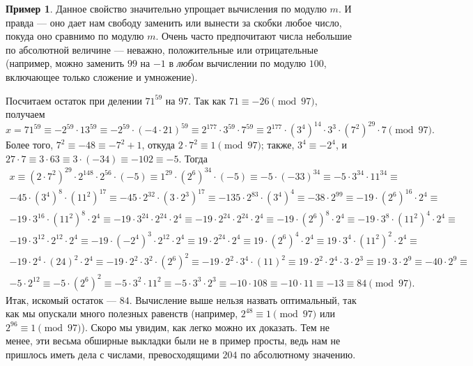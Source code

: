 \documentclass[12pt,notitlepage]{article}
\theoremstyle{plain}
\theoremstyle{definition}
\newtheorem{exm}[thm]{Пример}
\theoremstyle{plain}
\newcommand{\1}{\mathbf{1}}
\newcommand{\0}{\mathbf{0}}
\begin{document}
\begin{exm}
	Данное свойство значительно упрощает вычисления по модулю $m$. И правда --- оно дает нам свободу заменить или вынести за скобки любое число, покуда оно сравнимо по модулю $m$. Очень часто предпочитают числа небольшие по абсолютной величине --- неважно, положительные или отрицательные (например, можно заменить $99$ на $-1$ в \emph{любом} вычислении по модулю $100$, включающее только сложение и умножение).
	
	Посчитаем остаток при делении $71^{59}$ на $97$. Так как $71 \equiv -26 \pmod{97}$, получаем
	$$x = 71^{59} \equiv -2^{59}\cdot 13^{59} \equiv -2^{59}\cdot (-4\cdot 21)^{59} \equiv 2^{177} \cdot 3^{59} \cdot 7^{59} \equiv 2^{177} \cdot (3^4)^{14} \cdot 3^3 \cdot (7^2)^{29} \cdot 7  \pmod {97}.$$
	Более того, $7^2 \equiv -48 \equiv -7^2 + 1$, откуда $2\cdot7^2 \equiv 1 \pmod{97}$; также, $3^4 \equiv -2^4$, и $27\cdot 7 \equiv 3 \cdot 63 \equiv 3 \cdot (-34) \equiv -102 \equiv -5$. Тогда
	\begin{multline*}
		x \equiv (2\cdot 7^2)^{29} \cdot 2^{148} \cdot 2^{56} \cdot (-5) \equiv 1^{29} \cdot (2^6)^{34} \cdot (-5) \equiv -5 \cdot (-33) ^{34} \equiv -5 \cdot 3^{34} \cdot 11^{34}  \equiv \\
		-45 \cdot (3^4)^{8} \cdot (11^2)^{17} \equiv -45 \cdot 2^{32} \cdot (3 \cdot 2^3)^{17} \equiv -135 \cdot 2^{83} \cdot (3^4)^4  \equiv -38 \cdot 2^{99} \equiv -19 \cdot (2^6)^{16} \cdot 2^4 \equiv \\
		-19 \cdot 3^{16} \cdot (11^2)^8 \cdot 2^4 \equiv -19 \cdot 3^{24} \cdot 2^{24} \cdot 2^4 \equiv -19 \cdot 2^{24} \cdot 2^{24} \cdot 2^4  \equiv -19 \cdot (2^6)^8 \cdot 2^4 \equiv -19 \cdot 3^{8} \cdot (11^2)^4 \cdot 2^4 \equiv\\
		-19 \cdot 3^{12} \cdot 2^{12} \cdot 2^{4} \equiv -19 \cdot (-2^{4})^3 \cdot 2^{12} \cdot 2^4 \equiv 19 \cdot 2^{24} \cdot 2^4 \equiv 19 \cdot (2^6)^4 \cdot 2^4 \equiv 19 \cdot 3^{4} \cdot (11^2)^2 \cdot 2^4 \equiv\\
		-19 \cdot 2^{4} \cdot (24)^2 \cdot 2^4 \equiv -19 \cdot 2^2 \cdot 3^2 \cdot (2^6)^2 \equiv -19 \cdot 2^2 \cdot 3^4 \cdot (11)^2 \equiv 19 \cdot 2^2 \cdot 2^4 \cdot 3 \cdot 2^3 \equiv 19 \cdot 3 \cdot 2^9 \equiv -40 \cdot 2^9 \equiv\\
		-5 \cdot 2^{12} \equiv -5 \cdot (2^6)^2 \equiv -5 \cdot 3^2 \cdot 11^2 \equiv
		-5 \cdot 3^3 \cdot 2^3 \equiv -10 \cdot 108 \equiv -10 \cdot 11 \equiv -13 \equiv 84 \pmod {97}.
	\end{multline*}
	Итак, искомый остаток --- $84$. Вычисление выше нельзя назвать оптимальный, так как мы опускали много полезных равенств (например, $2^{48} \equiv 1 \pmod {97}$ или $2^{96} \equiv 1 \pmod {97}$). Скоро мы увидим, как легко можно их доказать. Тем не менее, эти весьма обширные выкладки были не в пример просты, ведь нам не пришлось иметь дела с числами, превосходящими $204$ по абсолютному значению.
\end{exm}
\end{document}
